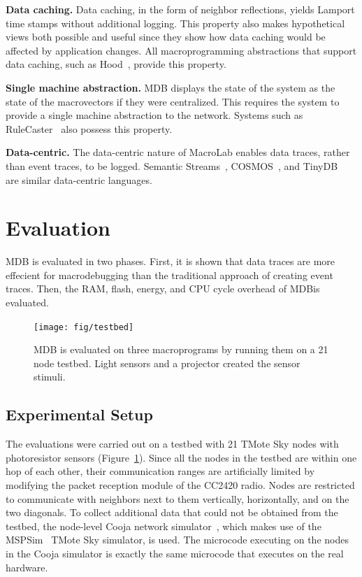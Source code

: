 \par {\bf Data caching. } Data caching, in the form of neighbor reflections,
  yields Lamport time stamps without additional logging. This property
  also makes hypothetical views both possible and useful since they show
  how data caching would be affected by application changes. All
  macroprogramming abstractions that support data caching, such as
  Hood~\cite{Whitehousea}, provide this property. 

\par {\bf Single machine abstraction. } MDB displays the state of the
system as the state of the macrovectors if they were centralized. This
requires the system to provide a single machine abstraction to the network.
Systems such as RuleCaster~\cite{Bischoff} also possess this property.

\par {\bf Data-centric. } The data-centric nature of MacroLab enables data
traces, rather than event traces, to be logged. Semantic
Streams~\cite{Whitehouse}, COSMOS~\cite{Awan2007}, and TinyDB~\cite{Madden} are
similar data-centric languages. 


\section{Evaluation} \label{evaluation}

MDB is evaluated in two phases. First, it is shown that data traces are more
effecient for macrodebugging than the traditional approach of creating event
traces.  Then, the RAM, flash, energy, and CPU cycle overhead of MDB\@ is
evaluated.

\begin{figure}[!htb]
  \centering
  \texttt{[image: fig/testbed]}
  \caption[Evaluation testbed with 21 Tmote Sky motes]{MDB is evaluated on three
  macroprograms by running them on a 21 node testbed. Light sensors and a
  projector created the sensor stimuli.}
  \label{fig:testbed}
\end{figure}

\subsection{Experimental Setup}
The evaluations were carried out on a testbed with 21 TMote Sky nodes with
photoresistor sensors (Figure~\ref{fig:testbed}). Since all the nodes in the
testbed are within one hop of each other, their communication ranges are
artificially limited by modifying the packet reception module of the CC2420
radio. Nodes are restricted to communicate with neighbors next to them
vertically, horizontally, and on the two diagonals.  To collect additional data
that could not be obtained from the testbed, the node-level Cooja network
simulator~\cite{Osterlind2006}, which makes use of the
MSPSim~\cite{Eriksson2007} TMote Sky simulator, is used.  The microcode
executing on the nodes in the Cooja simulator is exactly the same microcode that
executes on the real \tmotesky hardware.

